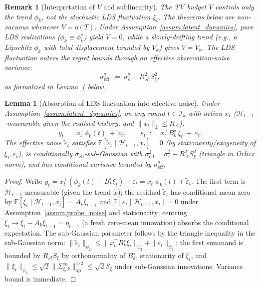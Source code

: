 \documentclass[11pt]{article}
\newcommand{\E}{\mathbb{E}}
\newcommand{\op}{\mathrm{op}}
\newcommand{\cA}{\mathcal{A}}
\newcommand{\cH}{\mathcal{H}}
\newcommand{\cI}{\mathcal{I}}
\newtheorem{lemma}{Lemma}
\newtheorem{remark}{Remark}
\begin{document}
\begin{remark}[Interpretation of $V$ and sublinearity]
\label{rem:lds_v_regime}
The TV budget $V$ controls only the trend $\phi_k$, not the stochastic LDS
fluctuation $\xi_t$.  The theorems below are non-vacuous whenever
$V=o(T)$.  Under Assumption~\ref{assum:latent_dynamics}, pure LDS realizations
($\phi_k\equiv\phi_k^\star$) yield $V=0$, while a slowly-drifting trend (e.g.,
a Lipschitz $\phi_k$ with total displacement bounded by $V_k$) gives $V=V_k$.
The LDS fluctuation enters the regret bounds through an \emph{effective}
observation-noise variance:
\begin{equation}
  \sigma_{\mathrm{eff}}^2\ :=\ \sigma_\varepsilon^2+R_\cA^2\,S_\xi^2,
  \label{eq:sigma_eff}
\end{equation}
as formalized in Lemma~\ref{lem:lds_absorption} below.
\end{remark}

\begin{lemma}[Absorption of LDS fluctuation into effective noise]
\label{lem:lds_absorption}
Under Assumption~\ref{assum:latent_dynamics}, on any round $t\in\cI_k$ with
action $x_t$ ($\cH_{t-1}$-measurable given the realised history, and
$\|x_t\|_2\le R_\cA$),
\[
  y_t\ =\ x_t^\top\phi_k(t)\ +\ \tilde\varepsilon_t,
  \qquad
  \tilde\varepsilon_t\ :=\ x_t^\top B_k^\star\,\xi_t\ +\ \varepsilon_t.
\]
The effective noise $\tilde\varepsilon_t$ satisfies
$\E[\tilde\varepsilon_t\mid\cH_{t-1},x_t]=0$ (by stationarity/exogeneity of
$\xi_t,\varepsilon_t$), is conditionally
$\sigma_{\mathrm{eff}}$-sub-Gaussian with
$\sigma_{\mathrm{eff}}^2=\sigma_\varepsilon^2+R_\cA^2 S_\xi^2$
(triangle in Orlicz norm), and has conditional variance bounded by
$\sigma_{\mathrm{eff}}^2$.
\end{lemma}

\begin{proof}
Write $y_t=x_t^\top(\phi_k(t)+B_k^\star\xi_t)+\varepsilon_t=x_t^\top\phi_k(t)+\tilde\varepsilon_t$.
The first term is $\cH_{t-1}$-measurable (given the trend is); the residual
$\tilde\varepsilon_t$ has conditional mean zero by
$\E[\xi_t\mid\cH_{t-1},x_t]=A_k\xi_{t-1}$ and
$\E[\varepsilon_t\mid\cH_{t-1},x_t]=0$ under Assumption~\ref{assum:probe_noise}
and stationarity; centring $\xi_t\to\xi_t-A_k\xi_{t-1}=\eta_{t-1}$ (a fresh zero-mean innovation) absorbs the conditional expectation.
The sub-Gaussian parameter follows by the triangle inequality in the
sub-Gaussian norm: $\|\tilde\varepsilon_t\|_{\psi_2}\le\|x_t^\top B_k^\star\xi_t\|_{\psi_2}+\|\varepsilon_t\|_{\psi_2}$;
the first summand is bounded by $R_\cA S_\xi$ by orthonormality of $B_k^\star$,
stationarity of $\xi_t$, and $\|\xi_t\|_{\psi_2}\le\sqrt{2}\|\Sigma_{\xi,k}^\infty\|^{1/2}_{\op}\le\sqrt 2 S_\xi$ under sub-Gaussian innovations.  Variance bound is immediate.
\end{proof}
\end{document}
